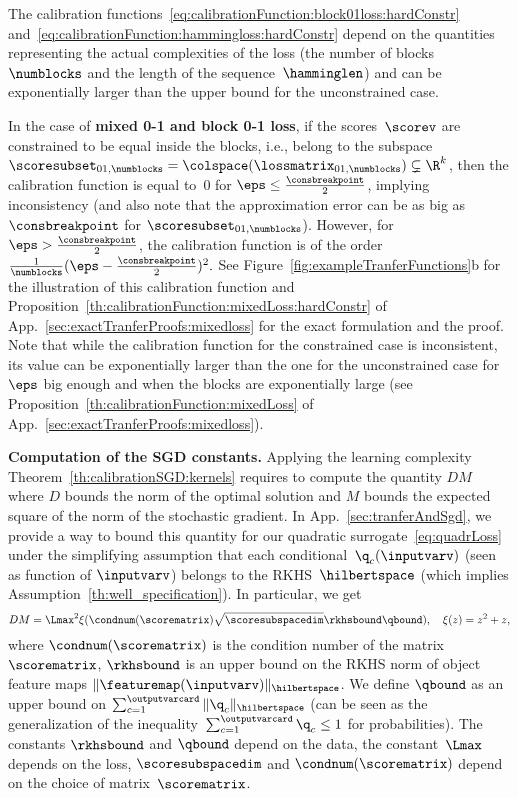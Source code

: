 \documentclass{article}
\begin{document}
The calibration functions~\eqref{eq:calibrationFunction:block01loss:hardConstr} and~\eqref{eq:calibrationFunction:hammingloss:hardConstr} depend on the quantities representing the actual complexities of the loss (the number of blocks~$\numblocks$ and the length of the sequence~$\hamminglen$) and can be exponentially larger than the upper bound for the unconstrained case.

In the case of \textbf{mixed 0-1 and block 0-1 loss},
if the scores~$\scorev$ are constrained to be equal inside the blocks, i.e., belong to the subspace~$\scoresubset_{01,\numblocks} = \colspace(\lossmatrix_{01,\numblocks}) \subsetneq \R^k$, then the calibration function is equal to~$0$ for $\eps \leq \frac{\consbreakpoint}{2}$, implying inconsistency (and also note that the approximation error can be as big as~$\consbreakpoint$ for $\scoresubset_{01,\numblocks}$).
However, for $\eps > \frac{\consbreakpoint}{2}$, the calibration function is of the order
$
\frac{1}{\numblocks} (\eps-\frac{\consbreakpoint}{2})^2.
$
See Figure~\ref{fig:exampleTranferFunctions}b for the illustration of this calibration function and Proposition~\ref{th:calibrationFunction:mixedLoss:hardConstr} of App.~\ref{sec:exactTranferProofs:mixedloss} for the exact formulation and the proof.
Note that while the calibration function for the constrained case is inconsistent, its value can be exponentially larger than the one for the unconstrained case for $\eps$ big enough and when the blocks are exponentially large (see Proposition~\ref{th:calibrationFunction:mixedLoss} of App.~\ref{sec:exactTranferProofs:mixedloss}).

\textbf{Computation of the SGD constants.}
Applying the learning complexity Theorem~\ref{th:calibrationSGD:kernels} requires to compute the quantity $DM$ where $D$ bounds the norm of the optimal solution and $M$ bounds the expected square of the norm of the stochastic gradient.
In App.~\ref{sec:tranferAndSgd}, we provide a way to bound this quantity for our quadratic surrogate~\eqref{eq:quadrLoss} under the simplifying assumption that each conditional~$\q_c(\inputvarv)$ (seen as function of $\inputvarv$) belongs to the RKHS~$\hilbertspace$ (which implies Assumption~\ref{th:well_specification}).
In particular, we get
\begin{equation}
\label{eq:sgdConstant}
DM
=
\Lmax^2 \xi(\condnum(\scorematrix) \sqrt{\scoresubspacedim} \rkhsbound  \qbound), \quad \xi(z) = z^2 + z,
\end{equation}
where $\condnum(\scorematrix)$ is the condition number of the matrix~$\scorematrix$, $\rkhsbound$ is an upper bound on the RKHS norm of object feature maps $\|\featuremap(\inputvarv)\|_\hilbertspace$. We define $\qbound$ as an upper bound on $\sum_{c=1}^{\outputvarcard} \|\q_c\|_\hilbertspace$ (can be seen as the generalization of the inequality~$\sum_{c=1}^{\outputvarcard} \q_c \leq 1$ for probabilities).
The constants $\rkhsbound$ and $\qbound$ depend on the data, the constant~$\Lmax$ depends on the loss, $\scoresubspacedim$ and $\condnum(\scorematrix)$ depend on the choice of matrix~$\scorematrix$.
\end{document}
